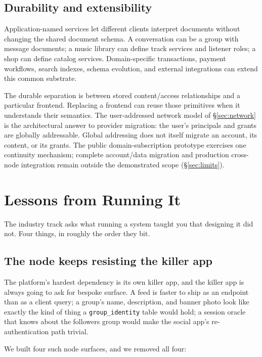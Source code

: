 \documentclass[sigconf, nonacm]{acmart}
\begin{document}
\subsection{Durability and extensibility}

Application-named services let different clients interpret documents without
changing the shared document schema. A conversation can be a group with
message documents; a music library can define track services and listener
roles; a shop can define catalog services. Domain-specific transactions,
payment workflows, search indexes, schema evolution, and external
integrations can extend this common substrate.

The durable separation is between stored content/access relationships and a
particular frontend. Replacing a frontend can reuse those primitives when it
understands their semantics. The user-addressed network model of
\S\ref{sec:network} is the architectural answer to provider migration: the
user's principals and grants are globally addressable. Global addressing does
not itself migrate an account, its content, or its grants. The public
domain-subscription prototype exercises one continuity mechanism; complete
account/data migration and production cross-node integration remain outside
the demonstrated scope (\S\ref{sec:limits}).

\section{Lessons from Running It}
\label{sec:lessons}

The industry track asks what running a system taught you that designing it
did not. Four things, in roughly the order they bit.

\subsection{The node keeps resisting the killer app}

The platform's hardest dependency is its own killer app, and the killer app
is always going to ask for bespoke surface. A feed is faster to ship as an
endpoint than as a client query; a group's name, description, and banner
photo look like exactly the kind of thing a \texttt{group\_identity} table
would hold; a session oracle that knows about the followers group would make
the social app's re-authentication path trivial.

We built four such node surfaces, and we removed all four:
\end{document}
